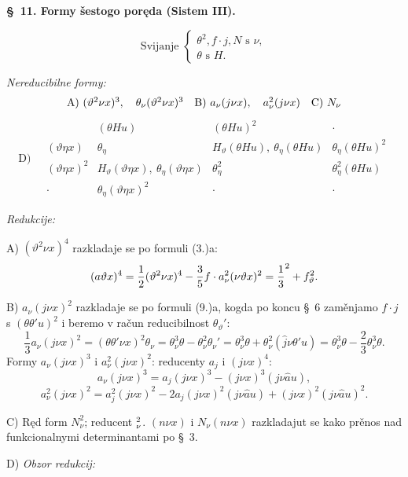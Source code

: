 \documentclass[11pt]{article}
\let\A\relax
\newcommand{\A}{\mathfrak A}
\begin{document}
\begin{center}
\textbf{\S\ 11. \quad Formy šestogo poręda (Sistem III).}
\end{center}
\[
\text{Svijanje }\left\{\begin{array}{l}
\theta^2,
 f\cdot j,
 N \text{ s }\nu,\\
\theta\text{ s }H.
\end{array}\right.
\]

\noindent\textit{Nereducibilne formy:}
\[
\begin{array}{c@{\quad}c@{\quad}c}
\mathrm{A)}\ (\vartheta^2\nu x)^3,\quad \theta_\nu(\vartheta^2\nu x)^3
&
\mathrm{B)}\ a_\nu(j\nu x),\quad a_\nu^2(j\nu x)
&
\mathrm{C)}\ N_\nu
\end{array}
\]
\[
\mathrm{D)}\quad
\begin{array}{c|c|c|c}
 & (\theta Hu)&(\theta Hu)^2&\cdot\\
(\vartheta\eta x)&\theta_\eta&H_\vartheta(\theta Hu),\ \theta_\eta(\theta Hu)&\theta_\eta(\theta Hu)^2\\
(\vartheta\eta x)^2&H_\vartheta(\vartheta\eta x),\ \theta_\eta(\vartheta\eta x)&\theta_\eta^2&\theta_\eta^2(\theta Hu)\\
\cdot&\theta_\eta(\vartheta\eta x)^2&\cdot&\cdot
\end{array}
\]

\noindent\textit{Redukcije:}

\noindent\mbox{A)} $(\vartheta^2\nu x)^4$ razkladaje se po formuli (3.)\mbox{a}:
\[
(a\A\vartheta x)^4=\frac12(\vartheta^2\nu x)^4-\frac35 f\cdot a_\nu^2(\nu\vartheta x)^2
=\frac13\A^2+f\A_\vartheta^2.
\]

\noindent\mbox{B)} $a_\nu(j\nu x)^2$ razkladaje se po formuli (9.)\mbox{a}, kogda po koncu \S\ 6 zaměnjamo $f\cdot j$ s $(\theta\theta'u)^2$ i beremo v račun reducibilnost $\theta_\vartheta'$:
\[
\frac13a_\nu(j\nu x)^2=(\theta\theta'\nu x)^2\theta_\nu
=\theta_\nu^3\theta-\theta_\nu^2\theta_\nu'
=\theta_\nu^3\theta+\theta_\nu^2(\widehat{j}\nu\theta'u)
=\theta_\nu^3\theta-\frac23\theta_\nu^3\theta.
\]
Formy $a_\nu(j\nu x)^3$ i $a_\nu^2(j\nu x)^2$: reducenty $a_j$ i $(j\nu x)^4$:
\[
a_\nu(j\nu x)^3=a_j(j\nu x)^3-(j\nu x)^3(j\nu\widehat{a}u),
\]
\[
a_\nu^2(j\nu x)^2=a_j^2(j\nu x)^2-2a_j(j\nu x)^2(j\nu\widehat{a}u)+(j\nu x)^2(j\nu\widehat{a}u)^2.
\]

\noindent\mbox{C)} Ręd form $N_\nu^2$; reducent $\A_\nu^2$. $(n\nu x)$ i $N_\nu(n\nu x)$ razkladajut se kako prěnos nad funkcionalnymi determinantami po \S\ 3.

\noindent\mbox{D)} \textit{Obzor redukcij:}
\end{document}
